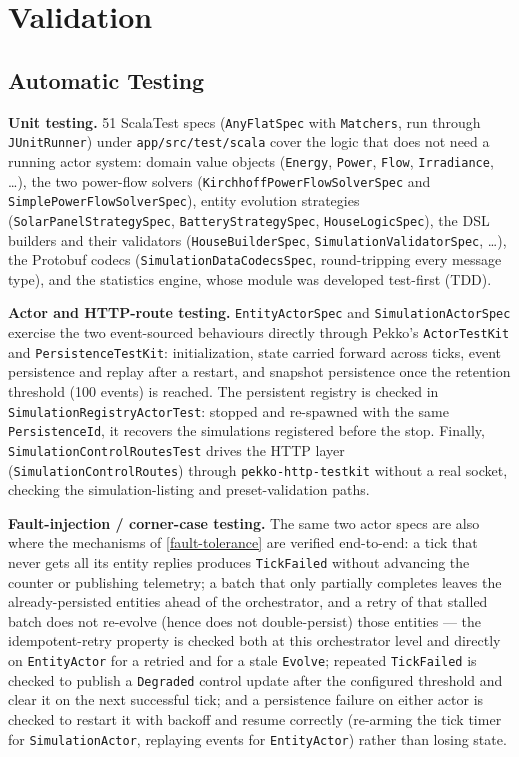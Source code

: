 \documentclass{scrreprt}
\begin{document}
\section{Validation}\label{validation}

\subsection{Automatic Testing}\label{automatic-testing}

\textbf{Unit testing.} 51 ScalaTest specs (\texttt{AnyFlatSpec} with \texttt{Matchers}, run
through \texttt{JUnitRunner}) under \texttt{app/src/test/scala} cover the logic that does not
need a running actor system: domain value objects (\texttt{Energy}, \texttt{Power},
\texttt{Flow}, \texttt{Irradiance}, \ldots), the two power-flow solvers
(\texttt{KirchhoffPowerFlowSolverSpec} and 
\texttt{SimplePowerFlowSolverSpec}), entity evolution strategies
(\texttt{SolarPanelStrategySpec}, \texttt{BatteryStrategySpec}, \texttt{HouseLogicSpec}), the
DSL builders and their validators (\texttt{HouseBuilderSpec},
\texttt{SimulationValidatorSpec}, \ldots), the Protobuf codecs
(\texttt{SimulationDataCodecsSpec}, round-tripping every message type), and the statistics
engine, whose module was developed test-first (TDD).

\textbf{Actor and HTTP-route testing.} \texttt{EntityActorSpec} and \texttt{SimulationActorSpec}
exercise the two event-sourced behaviours directly through Pekko's
\texttt{ActorTestKit} and \texttt{PersistenceTestKit}: initialization, state carried forward across
ticks, event persistence and replay after a restart, and snapshot persistence once the
retention threshold (100 events) is reached. The persistent registry is checked in
\texttt{SimulationRegistryActorTest}: stopped and re-spawned with the same
\texttt{PersistenceId}, it recovers the simulations registered before the stop. Finally,
\texttt{SimulationControlRoutesTest} drives the
HTTP layer (\texttt{SimulationControlRoutes}) through \texttt{pekko-http-testkit} without a real
socket, checking the simulation-listing and preset-validation paths.

\textbf{Fault-injection / corner-case testing.} The same two actor specs are also where the
mechanisms of \cref{fault-tolerance} are verified end-to-end: a tick that never gets all its
entity replies produces \texttt{TickFailed} without advancing the counter or publishing
telemetry; a batch that only partially completes leaves the already-persisted entities ahead of
the orchestrator, and a retry of that stalled batch does not re-evolve (hence does not
double-persist) those entities --- the idempotent-retry property is checked both at this
orchestrator level and directly on \texttt{EntityActor} for a retried and for a stale
\texttt{Evolve}; repeated \texttt{TickFailed} is checked to publish a \texttt{Degraded} control
update after the configured threshold and clear it on the next successful tick; and a
persistence failure on either actor is checked to restart it with backoff and resume correctly
(re-arming the tick timer for \texttt{SimulationActor}, replaying events for
\texttt{EntityActor}) rather than losing state.
\end{document}
